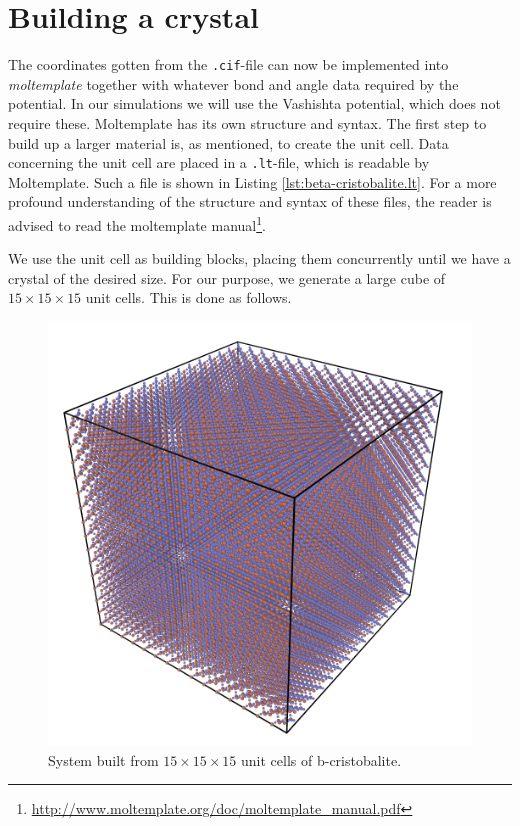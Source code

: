 \documentclass[twoside,english]{uiofysmaster}
\begin{document}
\section{Building a crystal}
The coordinates gotten from the \texttt{.cif}-file can now be implemented into \textit{moltemplate} together with whatever bond and angle data required by the potential. In our simulations we will use the Vashishta potential, which does not require these. 
Moltemplate has its own structure and syntax. 
The first step to build up a larger material is, as mentioned, to create the unit cell. 
Data concerning the unit cell are placed in a \texttt{.lt}-file, which is readable by Moltemplate. 
Such a file is shown in Listing \ref{lst:beta-cristobalite.lt}. 
For a more profound understanding of the structure and syntax of these files, the reader is advised to read the moltemplate manual\footnote{\url{http://www.moltemplate.org/doc/moltemplate_manual.pdf}}.

\begin{center}
\begin{minipage}{\linewidth}
	
\end{minipage}
\end{center}

We use the unit cell as building blocks, placing them concurrently until we have a crystal of the desired size. For our purpose, we generate a large cube of $15\times15\times15$ unit cells. This is done as follows.



\begin{figure}
	\centering
	\includegraphics[width=0.7\linewidth]{figures/CreatingSystem/hugeCube}
	\caption{System built from $15\times15\times15$ unit cells of b-cristobalite.}
	\label{fig:hugeCube}
\end{figure}
\end{document}
